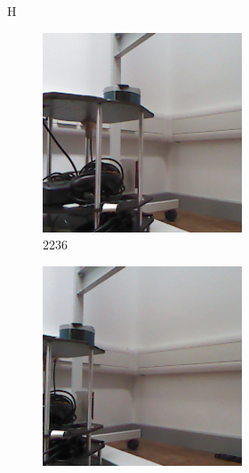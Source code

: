 \documentclass{article}
\begin{document}
\begin{figure}{H}
  \centering
  \begin{subfigure}[b]{0.3\textwidth}
    \includegraphics[width=\textwidth]{../worstimages/2019-01-31-14-38-57-806163.png}
    \caption{2236}
  \end{subfigure}
  \begin{subfigure}[b]{0.3\textwidth}
    \includegraphics[width=\textwidth]{../worstimages/2019-01-31-14-39-46-309718.png}

\end{subfigure}
\end{figure}
\end{document}
